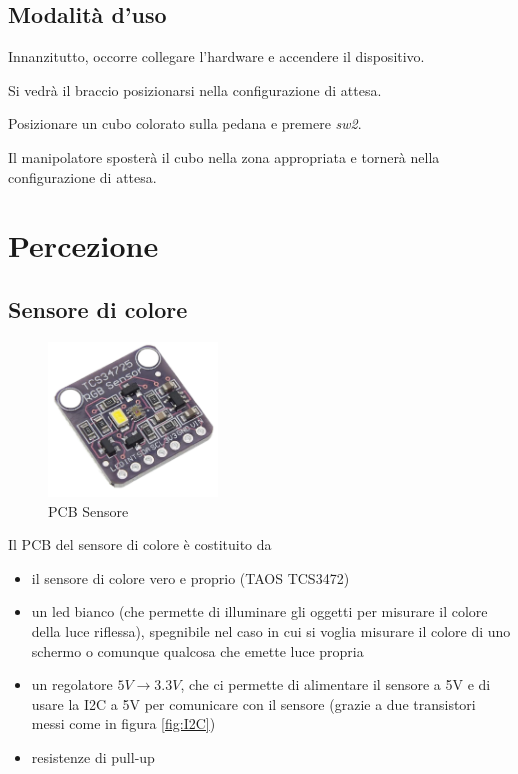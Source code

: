 \documentclass[12pt]{report}
\begin{document}
\section{Modalità d'uso}

Innanzitutto, occorre collegare l'hardware e accendere il dispositivo.

Si vedrà il braccio posizionarsi nella configurazione di attesa.

Posizionare un cubo colorato sulla pedana e premere \emph{sw2}.

Il manipolatore sposterà il cubo nella zona appropriata e tornerà nella configurazione di attesa.

\chapter{Percezione}
\section {Sensore di colore}

\begin{figure}
\centering
    \includegraphics[width=0.4\textwidth]{Immagini_sensore/pcb_sensore.png}
    \caption{PCB Sensore}
\end{figure}

Il PCB del sensore di colore è costituito da

\begin{itemize}
\item il sensore di colore vero e proprio (TAOS TCS3472)
\item un led bianco (che permette di illuminare gli oggetti per misurare il colore della luce riflessa), spegnibile nel caso in cui si voglia misurare il colore di uno schermo o comunque qualcosa che emette luce propria
\item un regolatore $5V \rightarrow 3.3V$, che ci permette di alimentare il sensore a 5V e di usare la I2C a 5V per comunicare con il sensore (grazie a due transistori messi come in figura \ref{fig:I2C})
\item resistenze di pull-up
\end{itemize}
\end{document}
